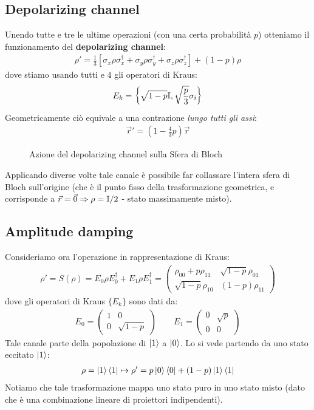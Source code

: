 \documentclass[../../InformazioneQuantistica.tex]{subfiles}
\begin{document}
\subsection{Depolarizing channel}
Unendo tutte e tre le ultime operazioni (con una certa probabilità $p$) otteniamo il funzionamento del \textbf{depolarizing channel}:
\begin{align*}
\rho' = \frac{1}{3}[\sigma_x \rho \sigma_x^\dag + \sigma_y \rho \sigma_y^\dag + \sigma_z\rho \sigma_z^\dag ] + (1-p)\rho
\end{align*}
dove stiamo usando tutti e $4$ gli operatori di Kraus:
\begin{align*}
E_k = \left\{\sqrt{1-p}\mathbb{I}, \sqrt{\frac{p}{3}}\sigma_i\right\}
\end{align*}
Geometricamente ciò equivale a una contrazione \textit{lungo tutti gli assi}:
\begin{align*}
\vec{r}' = \left(1-\frac{4}{3}p\right)\vec{r}
\end{align*}
\begin{figure}[H]
\centering

\caption{Azione del depolarizing channel sulla Sfera di Bloch\label{fig:depolarizing-geom}}
\end{figure}

Applicando diverse volte tale canale è possibile far collassare l'intera sfera di Bloch sull'origine (che è il punto fisso della trasformazione geometrica, e corrisponde a $\vec{r}=\vec{0}\Rightarrow \rho=\mathbb{I}/2$ - stato massimamente misto).

\subsection{Amplitude damping}
Consideriamo ora l'operazione in rappresentazione di Kraus:
\begin{align*}
\rho'=S(\rho) = E_0 \rho E_0^\dag + E_1 \rho E_1^\dag = \begin{pmatrix}
\rho_{00} + p\rho_{11} & \sqrt{1-p}\rho_{01}\\
\sqrt{1-p}\rho_{10} & (1-p)\rho_{11}\end{pmatrix}
\end{align*}
dove gli operatori di Kraus $\{E_k\}$ sono dati da:
\begin{align*}
E_0 = \begin{pmatrix}1 & 0\\ 0 & \sqrt{1-p}\end{pmatrix} \qquad E_1 = \begin{pmatrix} 0 & \sqrt{p}\\ 0 & 0 \end{pmatrix}
\end{align*}
Tale canale  parte della popolazione di $\Ket{1}$ a $\Ket{0}$. Lo si vede partendo da uno stato eccitato $\Ket{1}$:
\begin{align*}
\rho = \Ket{1}\Bra{1} \mapsto \rho' = p \Ket{0}\Bra{0} + (1-p) \Ket{1}\Bra{1}
\end{align*}
Notiamo che tale trasformazione mappa uno stato puro in uno stato misto (dato che è una combinazione lineare di proiettori indipendenti).
\end{document}
